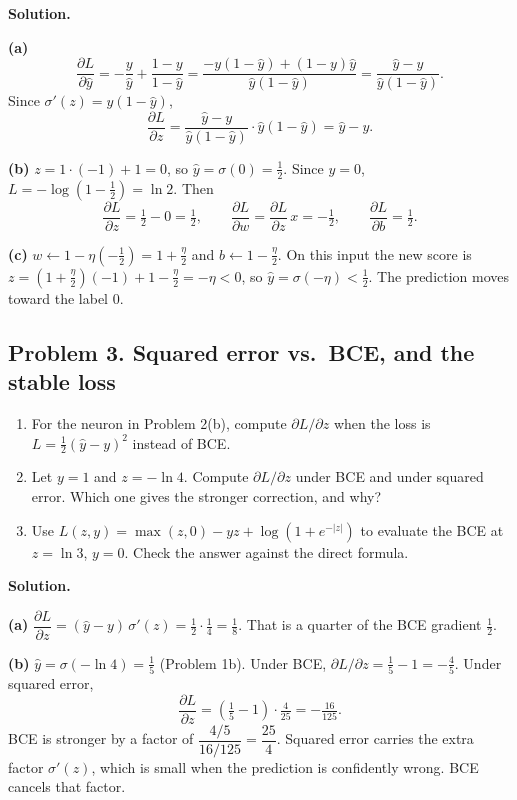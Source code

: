 \textbf{Solution.}

\textbf{(a)}
\[
\frac{\partial L}{\partial \hat y} = -\frac{y}{\hat y} + \frac{1-y}{1-\hat y} = \frac{-y(1-\hat y) + (1-y)\hat y}{\hat y(1-\hat y)} = \frac{\hat y - y}{\hat y(1-\hat y)}.
\]
Since $\sigma'(z) = \hat y(1-\hat y)$,
\[
\frac{\partial L}{\partial z} = \frac{\hat y - y}{\hat y(1-\hat y)}\cdot\hat y(1-\hat y) = \hat y - y.
\]

\textbf{(b)} $z = 1\cdot(-1) + 1 = 0$, so $\hat y = \sigma(0) = \tfrac12$. Since $y = 0$, $L = -\log(1 - \tfrac12) = \ln 2$. Then
\[
\frac{\partial L}{\partial z} = \tfrac12 - 0 = \tfrac12,\qquad \frac{\partial L}{\partial w} = \frac{\partial L}{\partial z}\,x = -\tfrac12,\qquad \frac{\partial L}{\partial b} = \tfrac12.
\]

\textbf{(c)} $w \leftarrow 1 - \eta(-\tfrac12) = 1 + \tfrac{\eta}{2}$ and $b \leftarrow 1 - \tfrac{\eta}{2}$. On this input the new score is $z = (1+\tfrac{\eta}2)(-1) + 1 - \tfrac{\eta}2 = -\eta < 0$, so $\hat y = \sigma(-\eta) < \tfrac12$. The prediction moves toward the label $0$.

\subsection*{Problem 3. Squared error vs.\ BCE, and the stable loss}

\begin{enumerate}[label=(\alph*)]
\item For the neuron in Problem 2(b), compute $\partial L/\partial z$ when the loss is $L = \frac12(\hat y - y)^2$ instead of BCE.
\item Let $y = 1$ and $z = -\ln 4$. Compute $\partial L/\partial z$ under BCE and under squared error. Which one gives the stronger correction, and why?
\item Use $L(z,y) = \max(z,0) - yz + \log(1 + e^{-|z|})$ to evaluate the BCE at $z = \ln 3$, $y = 0$. Check the answer against the direct formula.
\end{enumerate}

\textbf{Solution.}

\textbf{(a)} $\dfrac{\partial L}{\partial z} = (\hat y - y)\,\sigma'(z) = \tfrac12\cdot\tfrac14 = \tfrac18$. That is a quarter of the BCE gradient $\tfrac12$.

\textbf{(b)} $\hat y = \sigma(-\ln 4) = \tfrac15$ (Problem 1b). Under BCE, $\partial L/\partial z = \tfrac15 - 1 = -\tfrac45$. Under squared error,
\[
\frac{\partial L}{\partial z} = \left(\tfrac15 - 1\right)\cdot\tfrac{4}{25} = -\tfrac{16}{125}.
\]
BCE is stronger by a factor of $\dfrac{4/5}{16/125} = \dfrac{25}{4}$. Squared error carries the extra factor $\sigma'(z)$, which is small when the prediction is confidently wrong. BCE cancels that factor.

